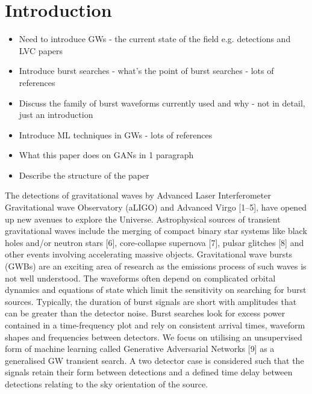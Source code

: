 \documentclass[%
 reprint,
 amsmath,amssymb,
 aps,
]{revtex4-2}
\begin{document}

\section{Introduction}

\begin{itemize}
\item Need to introduce GWs - the current state of the field e.g. detections
and LVC papers
\item Introduce burst searches - what's the point of burst searches - lots of references
\item Discuss the family of burst waveforms currently used and why - not in detail, just
an introduction
\item Introduce ML techniques in GWs - lots of references
\item What this paper does on GANs in 1 paragraph
\item Describe the structure of the paper 
\end{itemize}

The detections of gravitational waves by Advanced Laser Interferometer
Gravitational wave Observatory (aLIGO) and Advanced Virgo [1–5], have opened up
new avenues to explore the Universe. Astrophysical sources of transient
gravitational waves include the merging of compact binary star systems like
black holes and/or neutron stars [6], core-collapse supernova [7], pulsar
glitches [8] and other events involving accelerating massive objects.
Gravitational wave bursts (GWBs) are an exciting area of research as the
emissions process of such waves is not well understood. The waveforms often
depend on complicated orbital dynamics and equations of state which limit the
sensitivity on searching for burst sources. Typically, the duration of burst
signals are short with amplitudes that can be greater than the detector noise.
Burst searches look for excess power contained in a time-frequency plot and
rely on consistent arrival times, waveform shapes and frequencies between
detectors. We focus on utilising an unsupervised form of machine learning
called Generative Adversarial Networks [9] as a generalised GW transient
search. A two detector case is considered such that the signals retain their
form between detections and a defined time delay between detections relating to
the sky orientation of the source.
\end{document}
